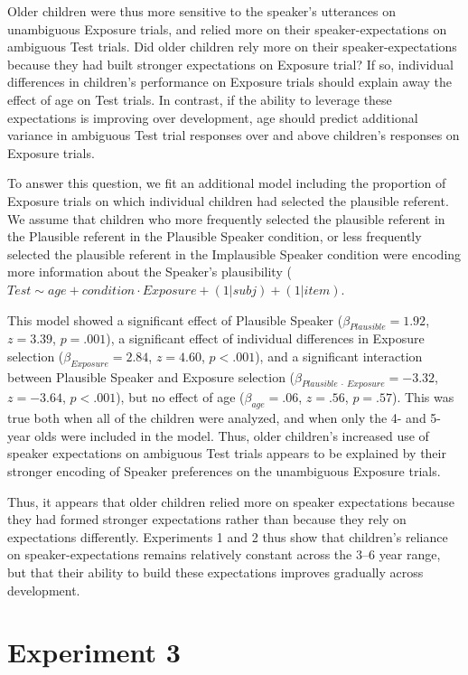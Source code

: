 \documentclass[man,floatsintext]{apa6}
\begin{document}
Older children were thus more sensitive to the speaker's utterances on unambiguous Exposure trials, and relied more on their speaker-expectations on ambiguous Test trials. Did older children rely more on their speaker-expectations because they had built stronger expectations on Exposure trial? If so, individual differences in children's performance on Exposure trials should explain away the effect of age on Test trials. In contrast, if the ability to leverage these expectations is improving over development, age should predict additional variance in ambiguous Test trial responses over and above children's responses on Exposure trials.

To answer this question, we fit an additional model including the proportion of Exposure trials on which individual children had selected the plausible referent. We assume that children who more frequently selected the plausible referent in the Plausible referent in the Plausible Speaker condition, or less frequently selected the plausible referent in the Implausible Speaker condition were encoding more information about the Speaker's plausibility ($Test \sim age + condition \cdot Exposure + (1|subj) + (1|item)$. 

This model showed a significant effect of Plausible Speaker ($\beta_{Plausible} = 1.92$, $z = 3.39$, $p = .001$), a significant effect of individual differences in Exposure selection ($\beta_{Exposure} = 2.84$, $z = 4.60$, $p < .001$), and a significant interaction between Plausible Speaker and Exposure selection ($\beta_{Plausible \: \cdot \: Exposure} = -3.32$, $z = -3.64$, $p < .001$), but no effect of age ($\beta_{age} = .06$, $z = .56$, $p = .57$). This was true both when all of the children were analyzed, and when only the 4- and 5- year olds were included in the model. Thus, older children's increased use of speaker expectations on ambiguous Test trials appears to be explained by their stronger encoding of Speaker preferences on the unambiguous Exposure trials.  

Thus, it appears that older children relied more on speaker expectations because they had formed stronger expectations rather than because they rely on expectations differently. Experiments 1 and 2 thus show that children's reliance on speaker-expectations remains relatively constant across the 3--6 year range, but that their ability to build these expectations improves gradually across development.


\section{Experiment 3}
\end{document}

